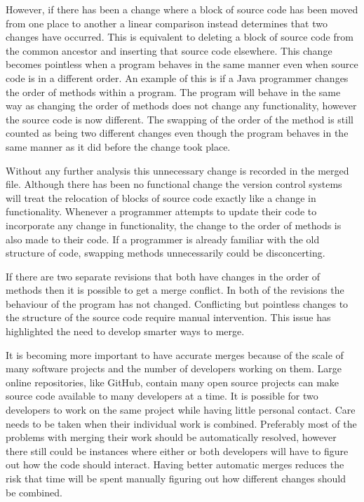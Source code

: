 However, if there has been a change where a block of source code has been moved from one place to another a linear comparison instead determines that two changes have occurred.  This is equivalent to deleting a block of source code from the common ancestor and inserting that source code elsewhere. This change becomes pointless when a program behaves in the same manner even when source code is in a different order.  An example of this is if a Java programmer changes the order of methods within a program.  The program will behave in the same way as changing the order of methods does not change any functionality, however the source code is now different. The swapping of the order of the method is still counted as being two different changes even though the program behaves in the same manner as it did before the change took place.

Without any further analysis this unnecessary change is recorded in the merged file.  Although there has been no functional change the version control systems will treat the relocation of blocks of source code exactly like a change in functionality.  Whenever a programmer attempts to update their code to incorporate any change in functionality, the change to the order of methods is also made to their code.  If a programmer is already familiar with the old structure of code, swapping methods unnecessarily could be disconcerting.

If there are two separate revisions that both have changes in the order of methods then it is possible to get a merge conflict. In both of the revisions the behaviour of the program has not changed. Conflicting but pointless changes to the structure of the source code require manual intervention. This issue has highlighted the need to develop smarter ways to merge.

It is becoming more important to have accurate merges because of the scale of many software projects and the number of developers working on them.  Large online repositories, like GitHub, contain many open source projects can make source code available to many developers at a time.  It is possible for two developers to work on the same project while having little personal contact. Care needs to be taken when their individual work is combined.  Preferably most of the problems with merging their work should be automatically resolved, however there still could be instances where either or both developers will have to figure out how the code should interact. Having better automatic merges reduces the risk that time will be spent manually figuring out how different changes should be combined.

